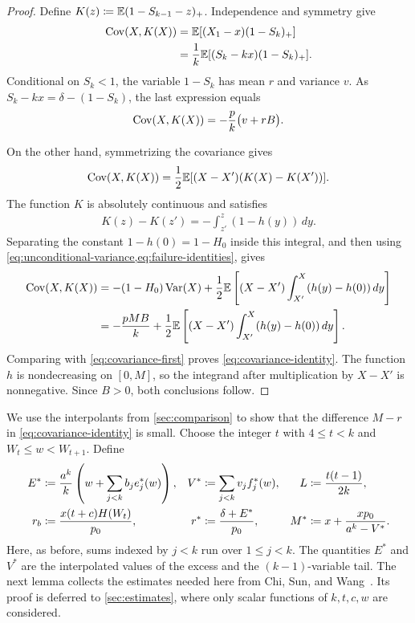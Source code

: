 \begin{proof}
Define $K(z)\coloneqq\mathbb E(1-S_{k-1}-z)_+$.
Independence and symmetry give
\begin{align*}
 \operatorname{Cov}(X,K(X))
 &=\mathbb E[(X_1-x)(1-S_k)_+]\\
 &=\frac1k\mathbb E[(S_k-kx)(1-S_k)_+].
\end{align*}
Conditional on $S_k<1$, the variable $1-S_k$ has mean $r$ and variance $v$.
As $S_k-kx=\delta-(1-S_k)$, the last expression equals
\begin{align}
 \operatorname{Cov}(X,K(X))=-\frac pk\bigl(v+rB\bigr).
 \label{eq:covariance-first}
\end{align}

On the other hand, symmetrizing the covariance gives
\begin{align*}
 \operatorname{Cov}(X,K(X))
 =\frac12\mathbb E[(X-X')(K(X)-K(X'))].
\end{align*}
The function $K$ is absolutely continuous and satisfies
\begin{align*}
 K(z)-K(z')=-\int_{z'}^z(1-h(y))\,dy.
\end{align*}
Separating the constant $1-h(0)=1-H_0$ inside this integral, and then using \cref{eq:unconditional-variance,eq:failure-identities}, gives
\begin{align*}
 \operatorname{Cov}(X,K(X))
 &=-(1-H_0)\operatorname{Var}(X)+\frac12\mathbb E\left[(X-X')\int_{X'}^X(h(y)-h(0))\,dy\right]\\
 &=-\frac{pMB}{k}+\frac12\mathbb E\left[(X-X')\int_{X'}^X(h(y)-h(0))\,dy\right].
\end{align*}
Comparing with \cref{eq:covariance-first} proves \cref{eq:covariance-identity}.
The function $h$ is nondecreasing on $[0,M]$, so the integrand after multiplication by $X-X'$ is nonnegative.
Since $B>0$, both conclusions follow.
\end{proof}

We use the interpolants from \cref{sec:comparison} to show that the difference $M-r$ in \cref{eq:covariance-identity} is small.
Choose the integer $t$ with $4\le t<k$ and $W_t\le w<W_{t+1}$.
Define
\begin{align}
 E^*&\coloneqq\frac{a^k}{k}\left(w+\sum_{j<k}b_je_j^*(w)\right),
 &V^*&\coloneqq\sum_{j<k}v_jf_j^*(w),
 &L&\coloneqq\frac{t(t-1)}{2k},\notag\\
 r_b&\coloneqq\frac{x(t+c)H(W_t)}{p_0},
 &r^*&\coloneqq\frac{\delta+E^*}{p_0},
 &M^*&\coloneqq x+\frac{xp_0}{a^k-V^*}.
 \label{eq:comparison-definitions}
\end{align}
Here, as before, sums indexed by $j<k$ run over $1\le j<k$.
The quantities $E^*$ and $V^*$ are the interpolated values of the excess and the $(k-1)$-variable tail.
The next lemma collects the estimates needed here from Chi, Sun, and Wang~\cite[Lemmas 4.6--4.9]{CSW2026}.
Its proof is deferred to \cref{sec:estimates}, where only scalar functions of $k,t,c,w$ are considered.

